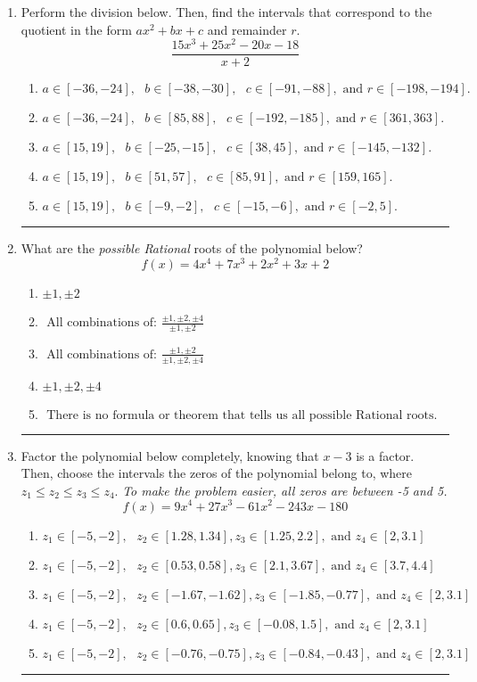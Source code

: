 \documentclass[14pt]{extbook}
\newcommand{\litem}[1]{\item#1\hspace*{-1cm}\rule{\textwidth}{0.4pt}}
\begin{document}
\begin{enumerate}
{\begin{enumerate}[label=\Alph*.]
\end{enumerate} }
\litem{
Perform the division below. Then, find the intervals that correspond to the quotient in the form $ax^2+bx+c$ and remainder $r$.\[ \frac{15x^{3} +25 x^{2} -20 x -18}{x + 2} \]\begin{enumerate}[label=\Alph*.]
\item \( a \in [-36, -24], \text{   } b \in [-38, -30], \text{   } c \in [-91, -88], \text{   and   } r \in [-198, -194]. \)
\item \( a \in [-36, -24], \text{   } b \in [85, 88], \text{   } c \in [-192, -185], \text{   and   } r \in [361, 363]. \)
\item \( a \in [15, 19], \text{   } b \in [-25, -15], \text{   } c \in [38, 45], \text{   and   } r \in [-145, -132]. \)
\item \( a \in [15, 19], \text{   } b \in [51, 57], \text{   } c \in [85, 91], \text{   and   } r \in [159, 165]. \)
\item \( a \in [15, 19], \text{   } b \in [-9, -2], \text{   } c \in [-15, -6], \text{   and   } r \in [-2, 5]. \)

\end{enumerate} }
\litem{
What are the \textit{possible Rational} roots of the polynomial below?\[ f(x) = 4x^{4} +7 x^{3} +2 x^{2} +3 x + 2 \]\begin{enumerate}[label=\Alph*.]
\item \( \pm 1,\pm 2 \)
\item \( \text{ All combinations of: }\frac{\pm 1,\pm 2,\pm 4}{\pm 1,\pm 2} \)
\item \( \text{ All combinations of: }\frac{\pm 1,\pm 2}{\pm 1,\pm 2,\pm 4} \)
\item \( \pm 1,\pm 2,\pm 4 \)
\item \( \text{ There is no formula or theorem that tells us all possible Rational roots.} \)

\end{enumerate} }
\litem{
Factor the polynomial below completely, knowing that $x-3$ is a factor. Then, choose the intervals the zeros of the polynomial belong to, where $z_1 \leq z_2 \leq z_3 \leq z_4$. \textit{To make the problem easier, all zeros are between -5 and 5.}\[ f(x) = 9x^{4} +27 x^{3} -61 x^{2} -243 x -180 \]\begin{enumerate}[label=\Alph*.]
\item \( z_1 \in [-5, -2], \text{   }  z_2 \in [1.28, 1.34], z_3 \in [1.25, 2.2], \text{   and   } z_4 \in [2, 3.1] \)
\item \( z_1 \in [-5, -2], \text{   }  z_2 \in [0.53, 0.58], z_3 \in [2.1, 3.67], \text{   and   } z_4 \in [3.7, 4.4] \)
\item \( z_1 \in [-5, -2], \text{   }  z_2 \in [-1.67, -1.62], z_3 \in [-1.85, -0.77], \text{   and   } z_4 \in [2, 3.1] \)
\item \( z_1 \in [-5, -2], \text{   }  z_2 \in [0.6, 0.65], z_3 \in [-0.08, 1.5], \text{   and   } z_4 \in [2, 3.1] \)
\item \( z_1 \in [-5, -2], \text{   }  z_2 \in [-0.76, -0.75], z_3 \in [-0.84, -0.43], \text{   and   } z_4 \in [2, 3.1] \)


\end{enumerate}}
\end{enumerate}
\end{document}
